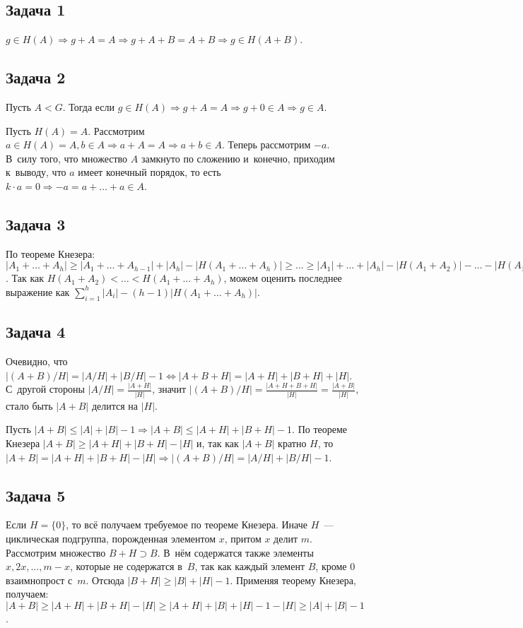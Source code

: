 \documentclass{article}
\begin{document}
\subsection*{Задача 1}
	$g \in H(A) \Rightarrow g + A = A \Rightarrow g + A + B = A + B \Rightarrow g
	\in H(A + B)$.

\subsection*{Задача 2}
	Пусть $A < G$. Тогда если $g \in H(A) \Rightarrow g + A = A \Rightarrow g + 0
	\in A \Rightarrow g \in A$.

	Пусть $H(A) = A$. Рассмотрим $a \in H(A) = A, b \in A \Rightarrow a + A = A
	\Rightarrow a +	b \in A$. Теперь рассмотрим $-a$. В~силу того, что множество
	$A$ замкнуто по сложению и~конечно, приходим к~выводу, что $a$ имеет конечный
	порядок, то есть $k \cdot a = 0 \Rightarrow -a = a + \ldots + a \in A$.

\subsection*{Задача 3}
	По теореме Кнезера:
	$|A_1 + \ldots + A_h| \ge |A_1 + \ldots + A_{h-1}| + |A_h| - |H(A_1 + \ldots
	+ A_h)| \ge \ldots \ge |A_1| + \ldots + |A_h| - |H(A_1 + A_2)| - \ldots
	- |H(A_1 + \ldots + A_h)|$. Так как $H(A_1 + A_2) < \ldots < H(A_1 + \ldots +
	A_h)$, можем оценить последнее выражение как $\sum\limits_{i=1}^h |A_i| -
	(h-1) |H(A_1 + \ldots + A_h)|$.

\subsection*{Задача 4}
	Очевидно, что $|(A+B)/H| = |A/H| + |B/H| - 1 \Leftrightarrow |A + B + H| = |A +
	H| + |B + H| + |H|$. С~другой стороны $|A/H| = \frac{|A+H|}{|H|}$, значит
	$|(A+B)/H| = \frac{|A + H + B + H|}{|H|} = \frac{|A + B|}{|H|}$, стало быть
	$|A+B|$ делится на $|H|$.

	Пусть $|A + B| \le |A| + |B| - 1 \Rightarrow |A + B| \le |A + H| + |B + H| - 1$.
	По теореме Кнезера $|A + B| \ge |A + H| + |B + H| - |H|$ и, так как $|A + B|$
	кратно $H$, то $|A + B| = |A + H| + |B + H| - |H| \Rightarrow |(A + B)/H| =
	|A/H| + |B/H| - 1$.

\subsection*{Задача 5}
	Если $H = \{0\}$, то всё получаем требуемое по теореме Кнезера. Иначе $H$~---
	циклическая подгруппа, порожденная элементом $x$, притом $x$ делит $m$.
	Рассмотрим множество $B + H \supset B$. В~нём содержатся также элементы $x, 2x,
	\ldots, m - x$, которые не содержатся в~$B$, так как каждый элемент $B$, кроме 0
	взаимнопрост с~$m$. Отсюда $|B + H| \ge |B| + |H| - 1$. Применяя теорему
	Кнезера, получаем: $|A + B| \ge |A + H| + |B + H| - |H| \ge |A + H| + |B| + |H|
	- 1 - |H| \ge |A| + |B| - 1$.
\end{document}
